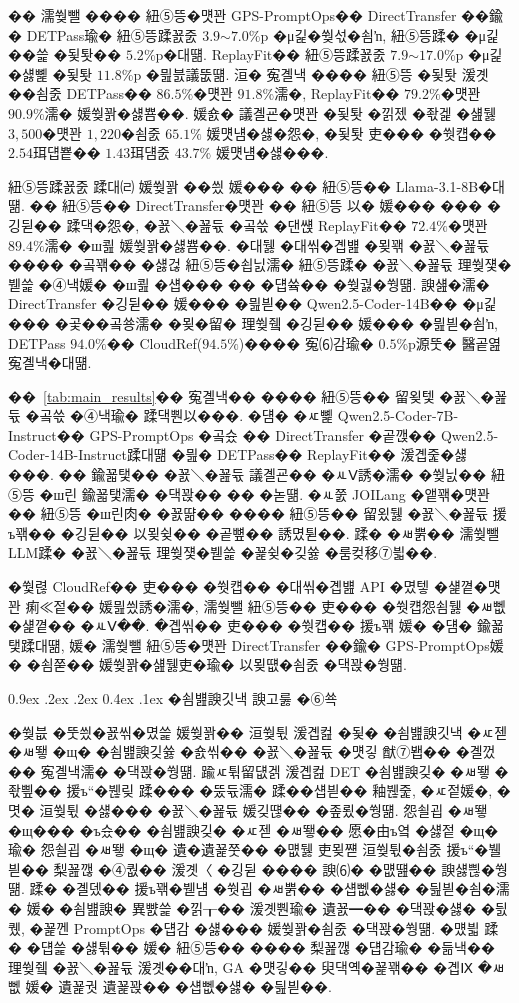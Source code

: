 \documentclass[10pt,twocolumn]{article}
\makeatletter
\renewcommand{\subsection}{\@startsection{subsection}{2}{\z@}%
{0.9ex \@plus .2ex \@minus .2ex}%
{0.4ex \@plus .1ex}%
{\normalfont\normalsize\bfseries}}
\makeatother
\begin{document}
�� 濡쒖뺄 ���� 紐⑤뜽�먯꽌 GPS-PromptOps�� DirectTransfer ��鍮� DETPass瑜� 紐⑤뜽蹂꾨줈 $3.9$$\sim$$7.0$\%p �μ긽�쒖섟�쇰ŉ, 紐⑤뜽蹂� �μ긽 ��쓽 �됯퇏�� $5.2$\%p�대떎. ReplayFit�� 紐⑤뜽蹂꾨줈 $7.9$$\sim$$17.0$\%p �μ긽�섏뼱 �됯퇏 $11.8$\%p �믪븘議뚮떎. 洹� 寃곌낵 ���� 紐⑤뜽 �됯퇏 湲곗��쇰줈 DETPass�� $86.5\%$�먯꽌 $91.8\%$濡�, ReplayFit�� $79.2\%$�먯꽌 $90.9\%$濡� 媛쒖꽑�섏뿀��. 媛숈� 議곌굔�먯꽌 �됯퇏 �낅젰 �좏겙 �섎뒗 $3{,}500$�먯꽌 $1{,}220$�쇰줈 $65.1\%$ 媛먯냼�섏�怨�, �됯퇏 吏��� �쒓컙�� $2.54$珥덉뿉�� $1.43$珥덈줈 $43.7\%$ 媛먯냼�섏���.

紐⑤뜽蹂꾨줈 蹂대㈃ 媛쒖꽑 ��씠 媛��� �� 紐⑤뜽�� Llama-3.1-8B�대떎. �� 紐⑤뜽�� DirectTransfer�먯꽌 �� 紐⑤뜽 以� 媛��� ��� �깅뒫�� 蹂댁�怨�, �꾨＼�꾪듃 �곸쓳 �댄썑 ReplayFit�� $72.4\%$�먯꽌 $89.4\%$濡� �ш쾶 媛쒖꽑�섏뿀��. �대뒗 �대씪�곕뱶 �묒꽦 �꾨＼�꾪듃���� �곸꽦�� �섏걶 紐⑤뜽�쇱닔濡� 紐⑤뜽蹂� �꾨＼�꾪듃 理쒖쟻�붿쓽 �④낵媛� �ш쾶 �섑��� �� �덉쓬�� �쒖궗�쒕떎. 諛섎�濡� DirectTransfer �깅뒫�� 媛��� �믪븯�� Qwen2.5-Coder-14B�� �μ긽 ��� �곷��곸쑝濡� �묒�留� 理쒖쥌 �깅뒫�� 媛��� �믪븯�쇰ŉ, DETPass $94.0\%$�� CloudRef($94.5\%$)���� 寃⑹감瑜� $0.5$\%p源뚯� 醫곹엺 寃곌낵�대떎.

��~\ref{tab:main_results}�� 寃곌낵�� ���� 紐⑤뜽�� 留욎텣 �꾨＼�꾪듃 �곸쓳 �④낵瑜� 蹂댁뿬以���. �덈� �ㅼ뼱 Qwen2.5-Coder-7B-Instruct�� GPS-PromptOps �곸슜 �� DirectTransfer �곹깭�� Qwen2.5-Coder-14B-Instruct蹂대떎 �믪� DETPass�� ReplayFit�� 湲곕줉�섏���. �� 鍮꾧탳�� �꾨＼�꾪듃 議곌굔�� �ㅻⅤ誘�濡� �쒖닔�� 紐⑤뜽 �ш린 鍮꾧탳濡� �댁꽍�� �� �녿떎. �ㅻ쭔 JOILang �앹꽦�먯꽌�� 紐⑤뜽 �ш린肉� �꾨땲�� ���� 紐⑤뜽�� 留욌뒗 �꾨＼�꾪듃 援ъ꽦�� �깅뒫�� 以묒슂�� �곹뼢�� 誘몄튇��. 蹂� �ㅽ뿕�� 濡쒖뺄 LLM蹂� �꾨＼�꾪듃 理쒖쟻�붿쓽 �꾩슂�깆쓣 �룸컺移⑦븳��.

�쒗렪 CloudRef�� 吏��� �쒓컙�� �대씪�곕뱶 API �몄텧 �섍꼍�먯꽌 痢≪젙�� 媛믪씠誘�濡�, 濡쒖뺄 紐⑤뜽�� 吏��� �쒓컙怨쇰뒗 �ㅽ뻾 �섍꼍�� �ㅻⅤ��. �곕씪�� 吏��� �쒓컙�� 援ъ꽦 媛� �덈� 鍮꾧탳蹂대떎, 媛� 濡쒖뺄 紐⑤뜽�먯꽌 DirectTransfer ��鍮� GPS-PromptOps媛� �쇰쭏�� 媛쒖꽑�섎뒗吏�瑜� 以묒떖�쇰줈 �댁꽍�쒕떎.

\subsection{�쇰뱶諛깃낵 諛고룷 �⑥쑉}

�쒖븞 �뚯씠�꾨씪�몄쓽 媛쒖꽑�� 洹쒖튃 湲곕컲 �됯� �쇰뱶諛깃낵 �ㅼ젣 �ㅽ뙣 �щ� �쇰뱶諛깆쓣 �숈씪�� �꾨＼�꾪듃 �먯깋 猷⑦봽�� �곌껐�� 寃곌낵濡� �댁꽍�쒕떎. 踰ㅼ튂留덊겕 湲곕컲 DET �쇰뱶諛깆� �ㅽ뙣 �좏삎�� 援ъ“�붾맂 蹂��� �뚰듃濡� 蹂��섑븯�� 釉붾줉, �ㅼ젙媛�, �몃� 洹쒖튃 �섏��� �꾨＼�꾪듃 媛깆떊�� �좊룄�쒕떎. 怨쇨굅 �ㅽ뙣 �щ��� �ъ슜�� �쇰뱶諛깆� �ㅼ젣 �ㅽ뙣�� 愿�由ъ옄 �섏젙 �щ�瑜� 怨쇨굅 �ㅽ뙣 �щ� 遺�遺꾩쭛�� �먮뒗 吏묒쨷 洹쒖튃�쇰줈 援ъ“�뷀븯�� 梨꾪깮 �④퀎�� 湲곗〈 �깅뒫 ���� 諛⑹� �먮떒�� 諛섏쁺�쒕떎. 蹂� �곌뎄�� 援ъ꽦�붿냼 �쒓굅 �ㅽ뿕�� �섑뻾�섏� �딆븯�쇰�濡� 媛� �쇰뱶諛� 異뺤쓽 �낅┰�� 湲곗뿬瑜� 遺꾨━�� �댁꽍�섏� �딄퀬, �꾩껜 PromptOps �덉감 �섏��� 媛쒖꽑�쇰줈 �댁꽍�쒕떎. �먰븳 蹂� �덉쓽 �섏튂�� 媛� 紐⑤뜽�� ���� 梨꾪깮 �덉감瑜� �듦낵�� 理쒖쥌 �꾨＼�꾪듃 湲곗��대ŉ, GA �먯깋�� 臾댁옉�꾩꽦�� �곕Ⅸ �ㅽ뻾 媛� 遺꾩궛 遺꾩꽍�� �섑뻾�섏� �딆븯��.
\end{document}
